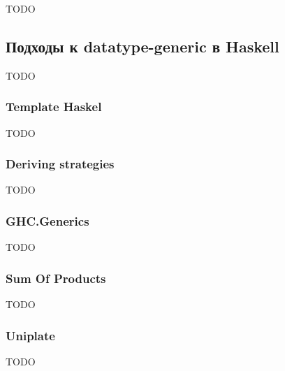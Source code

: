 TODO %

\subsection{Подходы к datatype-generic в Haskell}

TODO %

\subsubsection{Template Haskel}





TODO %

\subsubsection{Deriving strategies}



TODO

\subsubsection{GHC.Generics}

TODO %

\subsubsection{Sum Of Products}

TODO %

\subsubsection{Uniplate}


TODO %


